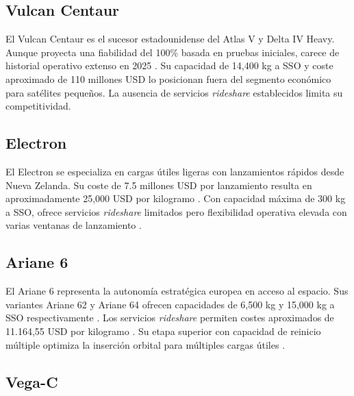 \subsection{Vulcan Centaur}

El Vulcan Centaur es el sucesor estadounidense del Atlas V y Delta IV Heavy. Aunque proyecta una fiabilidad del 100\% basada en pruebas iniciales, carece de historial operativo extenso en 2025 \cite{semanticscholar2023}. Su capacidad de 14,400 kg a SSO y coste aproximado de 110 millones USD lo posicionan fuera del segmento económico para satélites pequeños. La ausencia de servicios \textit{rideshare} establecidos limita su competitividad.

\subsection{Electron}

El Electron se especializa en cargas útiles ligeras con lanzamientos rápidos desde Nueva Zelanda. Su coste de 7.5 millones USD por lanzamiento resulta en aproximadamente 25,000 USD por kilogramo \cite{spaceinsider2023}. Con capacidad máxima de 300 kg a SSO, ofrece servicios \textit{rideshare} limitados pero flexibilidad operativa elevada con varias ventanas de lanzamiento \cite{wikipedia2024}.

\subsection{Ariane 6}

El Ariane 6 representa la autonomía estratégica europea en acceso al espacio. Sus variantes Ariane 62 y Ariane 64 ofrecen capacidades de 6,500 kg y 15,000 kg a SSO respectivamente \cite{esa2024}. Los servicios \textit{rideshare} permiten costes aproximados de 11.164,55 USD por kilogramo \cite{arstechnica2023}. Su etapa superior con capacidad de reinicio múltiple optimiza la inserción orbital para múltiples cargas útiles \cite{esa2024}.

\subsection{Vega-C}

